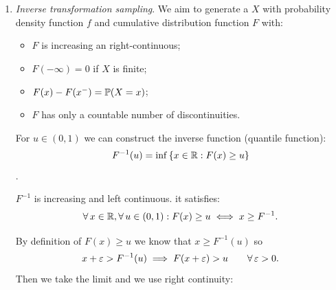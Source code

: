 \documentclass[12pt]{report}
\begin{document}
\begin{enumerate}[\circnum]
\begin{fancyproof}
	\end{fancyproof}
	If $U'\distunif{0,1}$ then $-\frac{1}{\lambda}\ln(U')\distexp{\lambda}$ and 
	\begin{equation*}
		\pr\left(-\frac{1}{\lambda}\ln(U')>t\right)=\pr(U'\leq e^{-\lambda t})=e^{-\lambda t}\qquad\every t>0.
	\end{equation*}
	Then we can use Box-Müller and get
	\begin{equation*}
		\begin{cases}
			X=\sqrt{-2\ln(U')}\cos(2\pi U)\\
			Y=\sqrt{-2\ln(U')}\sin(2\pi U).
		\end{cases}
	\end{equation*}
	In this way the whole transform is expressed in terms of uniform random variables, without needing to sample from a exponential distribution. We can also construct $n$-dimensional Gaussian vectors $(X_{1},\ldots,X_{d})$ 2 by 2.
	\item \emph{Inverse transformation sampling}. We aim to generate a \rv{} $X$ with probability density function $f$ and cumulative distribution function $F$ with:
	\begin{itemize}
		\item $F$ is increasing an right-continuous;
		\item $F(-\infty)=0$ if $X$ is finite;
		\item $F(x)-F(x^{-})=\mathbb{P}(X=x)$;
		\item $F$ has only a countable number of discontinuities.
	\end{itemize}
	For $u\in(0,1)$ we can construct the inverse function (quantile function):
	\begin{equation*}
		F^{-1}(u)=\inf\left\{x\in\mathbb{R}:F(x)\geq u\right\}
	\end{equation*}.
	\begin{proposition}
		$F^{-1}$ is increasing and left continuous. it satisfies:
		\begin{equation*}
			\forall\, x\in\mathbb{R},\forall\, u\in(0,1):F(x)\geq u\iff x\geq F^{-1}.
		\end{equation*}
	\end{proposition}
	\begin{fancyproof}
		By definition of $F(x)\geq u$ we know that $x\geq F^{-1}(u)$ so
		\begin{equation*}
			x+\varepsilon>F^{-1}(u)\implies F(x+\varepsilon)>u \qquad\forall\,\varepsilon>0.
		\end{equation*}
		Then we take the limit and we use right continuity:
		\begin{equation*}

\end{equation*}
\end{fancyproof}
\end{enumerate}
\end{document}
